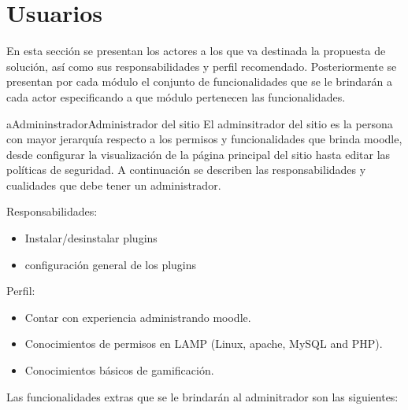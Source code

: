 \section{Usuarios}
\label{analisis:usuarios}

 En esta sección se presentan los actores a los que va destinada la propuesta de
 solución, así como sus responsabilidades y perfil recomendado. Posteriormente se
 presentan por cada módulo el conjunto de funcionalidades que se le brindarán a
 cada actor especificando a que módulo pertenecen las funcionalidades.


    \begin{actor}{aAdmininstrador}{Administrador del sitio}{%
    El adminsitrador del sitio es la persona con mayor jerarquía respecto a los
    permisos y funcionalidades que brinda moodle, desde configurar la visualización
    de la página principal del sitio hasta editar las políticas de seguridad. A
    continuación se describen las responsabilidades y cualidades que debe tener
    un administrador.\\}

    \item[Responsabilidades:] \hfill
        \begin{itemize}
        \item Instalar/desinstalar plugins
        \item configuración general de los plugins
        \end{itemize}

    \item[Perfil:] \hfill
        \begin{itemize}
        \item Contar con experiencia administrando moodle.
        \item Conocimientos de permisos en LAMP (Linux, apache, MySQL and PHP).
        \item Conocimientos básicos de gamificación.\\
        \end{itemize}
    \end{actor}

    \noindent
    Las funcionalidades extras que se le brindarán al adminitrador son las siguientes:

